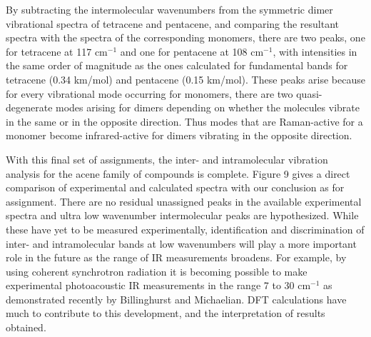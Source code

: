 
 By subtracting the intermolecular wavenumbers from the symmetric dimer vibrational spectra of tetracene and pentacene, and comparing the resultant spectra with the spectra of the corresponding monomers, there are two peaks, one for tetracene at 117 cm$^{-1}$ and one for pentacene at 108 cm$^{-1}$, with intensities in the same order of magnitude as the ones calculated for fundamental bands for tetracene (0.34 km/mol) and pentacene (0.15 km/mol). These peaks arise because for every vibrational mode occurring for monomers, there are two quasi-degenerate modes arising for dimers depending on whether the molecules vibrate in the same or in the opposite direction. Thus modes that are Raman-active for a monomer become infrared-active for dimers vibrating in the opposite direction. 
 
 With this final set of assignments, the inter- and intramolecular vibration analysis for the acene family of compounds is complete. Figure 9 gives a direct comparison of experimental and calculated spectra with our conclusion as for assignment. There are no residual unassigned peaks in the available experimental spectra and ultra low wavenumber intermolecular peaks are hypothesized.  While these have yet to be measured experimentally, identification and discrimination of inter- and intramolecular bands at low wavenumbers will play a more important role in the future as the range of IR measurements broadens. For example, by using coherent synchrotron radiation it is becoming possible to make experimental photoacoustic IR measurements in the range 7 to 30 cm$^{-1}$ as demonstrated recently by Billinghurst and Michaelian\cite{billinghurst2010photoacoustic}. DFT calculations have much to contribute to this development, and the interpretation of results obtained.
 
